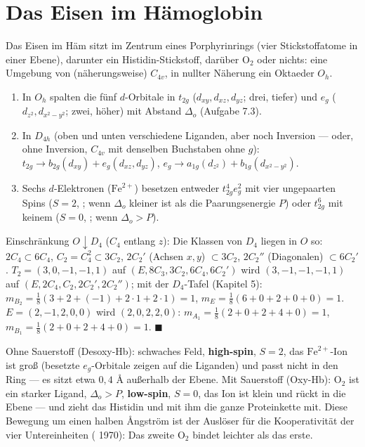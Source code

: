 \section{Das Eisen im Hämoglobin}

\begin{merksatz}
Das Eisen im Häm sitzt im Zentrum eines Porphyrinrings (vier Stickstoffatome in einer Ebene), darunter ein Histidin-Stickstoff, darüber $\mathrm{O_2}$ oder nichts: eine Umgebung von (näherungsweise) $C_{4v}$, in nullter Näherung ein Oktaeder $O_h$.
\begin{enumerate}[label=(\alph*), leftmargin=1.6em]
\item In $O_h$ spalten die fünf $d$-Orbitale in $t_{2g}$ ($d_{xy}, d_{xz}, d_{yz}$; drei, tiefer) und $e_g$ ($d_{z^{2}}, d_{x^{2}-y^{2}}$; zwei, höher) mit Abstand $\Delta_o$ (Aufgabe 7.3).
\item In $D_{4h}$ (oben und unten verschiedene Liganden, aber noch Inversion --- oder, ohne Inversion, $C_{4v}$ mit denselben Buchstaben ohne $g$): $t_{2g}\to b_{2g}(d_{xy}) + e_g(d_{xz}, d_{yz})$, $e_g\to a_{1g}(d_{z^{2}}) + b_{1g}(d_{x^{2}-y^{2}})$.
\item Sechs $d$-Elektronen ($\mathrm{Fe}^{2+}$) besetzen entweder $t_{2g}^{4}e_g^{2}$ mit vier ungepaarten Spins ($S = 2$, ; wenn $\Delta_o$ kleiner ist als die Paarungsenergie $P$) oder $t_{2g}^{6}$ mit keinem ($S = 0$, ; wenn $\Delta_o > P$).
\end{enumerate}

Einschränkung $O\downarrow D_4$ ($C_4$ entlang $z$): Die Klassen von $D_4$ liegen in $O$ so: $2C_4\subset6C_4$, $C_2 = C_4^{2}\subset3C_2$, $2C_2'$ (Achsen $x, y$) $\subset3C_2$, $2C_2''$ (Diagonalen) $\subset6C_2'$. $T_2 = (3, 0, -1, -1, 1)$ auf $(E, 8C_3, 3C_2, 6C_4, 6C_2')$ wird $(3, -1, -1, -1, 1)$ auf $(E, 2C_4, C_2, 2C_2', 2C_2'')$; mit der $D_4$-Tafel (Kapitel 5): $m_{B_2} = \frac18(3 + 2 + (-1) + 2\cdot1 + 2\cdot1) = 1$, $m_E = \frac18(6 + 0 + 2 + 0 + 0) = 1$. $E = (2, -1, 2, 0, 0)$ wird $(2, 0, 2, 2, 0)$: $m_{A_1} = \frac18(2 + 0 + 2 + 4 + 0) = 1$, $m_{B_1} = \frac18(2 + 0 + 2 + 4 + 0) = 1$. $\blacksquare$

Ohne Sauerstoff (Desoxy-Hb): schwaches Feld, \textbf{high-spin}, $S = 2$, das $\mathrm{Fe}^{2+}$-Ion ist groß (besetzte $e_g$-Orbitale zeigen auf die Liganden) und passt nicht in den Ring --- es sitzt etwa $0{,}4$ \AA{} außerhalb der Ebene. Mit Sauerstoff (Oxy-Hb): $\mathrm{O_2}$ ist ein starker Ligand, $\Delta_o > P$, \textbf{low-spin}, $S = 0$, das Ion ist klein und rückt in die Ebene --- und zieht das Histidin und mit ihm die ganze Proteinkette mit. Diese Bewegung um einen halben Ångström ist der Auslöser für die Kooperativität der vier Untereinheiten ( 1970): Das zweite $\mathrm{O_2}$ bindet leichter als das erste.


\end{merksatz}
